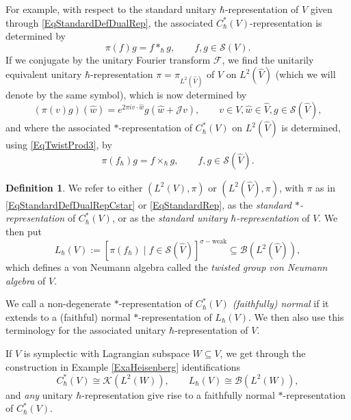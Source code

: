 \documentclass[11pt, reqno]{amsart}
\theoremstyle{definition}
\newtheorem{defn}[theorem]{Definition}
\numberwithin{equation}{section}
\def\Sc{\mathcal S}
\newcommand{\Bc}{\mathcal{B}}
\newcommand{\Kc}{\mathcal{K}}
\newcommand{\Jc}{\mathcal{J}}
\begin{document}
For example, with respect to the standard unitary $\hbar$-representation of $V$ given through \eqref{EqStandardDefDualRep}, the associated $C^*_{\hbar}(V)$-representation is determined by 
\begin{equation}\label{EqStandardDefDualRepCstar}
\pi(f) g = f\ast_{\hbar}g,\qquad f,g\in \Sc(V).
\end{equation}
If we conjugate by the unitary Fourier transform $\mathscr{F}$, we find the unitarily equivalent unitary $\hbar$-representation $\pi = \pi_{L^2(\hat{V})}$ of $V$ on $L^2(\hat{V})$ (which we will denote by the same symbol), which is now determined by 
\begin{equation}\label{EqStandardDefRep}
(\pi(v)g)(\hat{w}) = e^{2\pi i v\cdot \hat{w}} g(\hat{w} + \Jc v),\qquad v\in V,\hat{w}\in \hat{V},g\in \mathcal{S}(\hat{V}), 
\end{equation}
and where the associated $*$-representation of $C_{\hbar}^*(V)$ on $L^2(\hat{V})$ is  determined,
using \eqref{EqTwistProd3}, by 
\begin{equation}\label{EqStandardRep}
\pi(f_{\hbar})g = f\times_{\hbar} g,\qquad f,g\in \Sc(\hat{V}).
\end{equation}

\begin{defn}
We refer to either $(L^2(V),\pi)$ or $(L^2(\hat{V}),\pi)$, with $\pi$ as in \eqref{EqStandardDefDualRepCstar} or \eqref{EqStandardRep}, as the \emph{standard $*$-representation} of $C_{\hbar}^*(V)$, or as the \emph{standard unitary $\hbar$-representation} of $V$. We then put 
\begin{equation}\label{EqvNQT}
L_{\hbar}(V) := [\pi(f_{\hbar}) \mid f\in \Sc(\hat{V})]^{\sigma-\textrm{weak}} \subseteq \Bc(L^2(\hat{V})),
\end{equation}
which defines a von Neumann algebra called the \emph{twisted group von Neumann algebra} of $V$. 


We call a non-degenerate $*$-representation of $C_{\hbar}^*(V)$ \emph{(faithfully) normal} if it extends to a (faithful) normal $*$-representation of $L_{\hbar}(V)$. We then also use this terminology for the associated unitary $\hbar$-representation of $V$. 
\end{defn}


If $V$ is symplectic with Lagrangian subspace $W \subseteq V$, we get through the construction in Example \ref{ExaHeisenberg} identifications 
\begin{equation}
C_{\hbar}^*(V) \cong \Kc(L^2(W)),\qquad L_{\hbar}(V) \cong \Bc(L^2(W)), 
\end{equation}
and \emph{any} unitary $\hbar$-representation give rise to a faithfully normal $*$-representation of $C^*_{\hbar}(V)$. 
\end{document}
